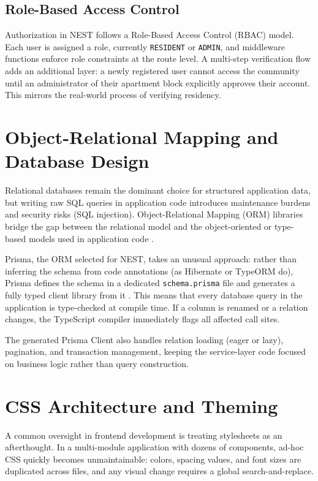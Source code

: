 \subsection{Role-Based Access Control}

Authorization in NEST follows a Role-Based Access Control (RBAC) model. Each user is assigned a role, currently \texttt{RESIDENT} or \texttt{ADMIN}, and middleware functions enforce role constraints at the route level. A multi-step verification flow adds an additional layer: a newly registered user cannot access the community until an administrator of their apartment block explicitly approves their account. This mirrors the real-world process of verifying residency.

\section{Object-Relational Mapping and Database Design}

Relational databases remain the dominant choice for structured application data, but writing raw SQL queries in application code introduces maintenance burdens and security risks (SQL injection). Object-Relational Mapping (ORM) libraries bridge the gap between the relational model and the object-oriented or type-based models used in application code \cite{elmasri2015fundamentals}.

Prisma, the ORM selected for NEST, takes an unusual approach: rather than inferring the schema from code annotations (as Hibernate or TypeORM do), Prisma defines the schema in a dedicated \texttt{schema.prisma} file and generates a fully typed client library from it \cite{prismaDocs}. This means that every database query in the application is type-checked at compile time. If a column is renamed or a relation changes, the TypeScript compiler immediately flags all affected call sites.

The generated Prisma Client also handles relation loading (eager or lazy), pagination, and transaction management, keeping the service-layer code focused on business logic rather than query construction.

\section{CSS Architecture and Theming}

A common oversight in frontend development is treating stylesheets as an afterthought. In a multi-module application with dozens of components, ad-hoc CSS quickly becomes unmaintainable: colors, spacing values, and font sizes are duplicated across files, and any visual change requires a global search-and-replace.

